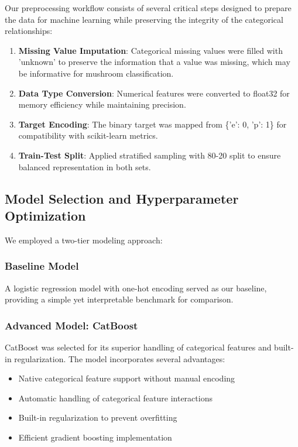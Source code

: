 \documentclass[11pt,a4paper]{article}
\begin{document}
Our preprocessing workflow consists of several critical steps designed to prepare the data for machine learning while preserving the integrity of the categorical relationships:

\begin{enumerate}
    \item \textbf{Missing Value Imputation}: Categorical missing values were filled with 'unknown' to preserve the information that a value was missing, which may be informative for mushroom classification.
    
    \item \textbf{Data Type Conversion}: Numerical features were converted to float32 for memory efficiency while maintaining precision.
    
    \item \textbf{Target Encoding}: The binary target was mapped from \{'e': 0, 'p': 1\} for compatibility with scikit-learn metrics.
    
    \item \textbf{Train-Test Split}: Applied stratified sampling with 80-20 split to ensure balanced representation in both sets.
\end{enumerate}

\subsection{Model Selection and Hyperparameter Optimization}

We employed a two-tier modeling approach:

\subsubsection{Baseline Model}
A logistic regression model with one-hot encoding served as our baseline, providing a simple yet interpretable benchmark for comparison.

\subsubsection{Advanced Model: CatBoost}
CatBoost was selected for its superior handling of categorical features and built-in regularization. The model incorporates several advantages:

\begin{itemize}
    \item Native categorical feature support without manual encoding
    \item Automatic handling of categorical feature interactions
    \item Built-in regularization to prevent overfitting
    \item Efficient gradient boosting implementation
\end{itemize}
\end{document}
